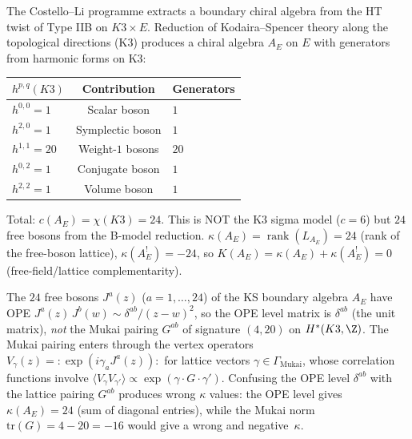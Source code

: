 \begin{construction}
\label{constr:costello-li-k3xe}
The Costello--Li programme extracts a boundary chiral algebra from
the HT twist of Type IIB on $K3 \times E$. Reduction of
Kodaira--Spencer theory along the topological directions (K3)
produces a chiral algebra $A_E$ on $E$ with generators from
harmonic forms on K3:
\begin{center}
\small
\renewcommand{\arraystretch}{1.2}
\begin{tabular}{lcl}
$h^{p,q}(K3)$ & Contribution & Generators \\
\hline
$h^{0,0} = 1$ & Scalar boson & $1$ \\
$h^{2,0} = 1$ & Symplectic boson & $1$ \\
$h^{1,1} = 20$ & Weight-$1$ bosons & $20$ \\
$h^{0,2} = 1$ & Conjugate boson & $1$ \\
$h^{2,2} = 1$ & Volume boson & $1$
\end{tabular}
\end{center}
Total: $c(A_E) = \chi(K3) = 24$. This is NOT the K3 sigma model
($c = 6$) but $24$ free bosons from the B-model reduction.
$\kappa(A_E) = \operatorname{rank}(L_{A_E}) = 24$
\textup{(}rank of the free-boson lattice\textup{)},
$\kappa(A_E^!) = -24$, so
$K(A_E) = \kappa(A_E) + \kappa(A_E^!) = 0$
\textup{(}free-field/lattice complementarity\textup{)}.
\end{construction}

\begin{warning}
\label{warn:ope-level-mukai}
The $24$ free bosons $J^a(z)$ ($a = 1, \ldots, 24$) of the KS
boundary algebra $A_E$ have OPE
$J^a(z)\,J^b(w) \sim \delta^{ab}/(z-w)^2$,
so the OPE level matrix is $\delta^{ab}$ (the unit matrix),
\emph{not} the Mukai pairing $G^{ab}$ of signature $(4,20)$ on
$H^*(K3, \Z)$. The Mukai pairing enters through the vertex
operators $V_\gamma(z) = {:}\!\exp(i\gamma_a J^a(z))\!{:}$
for lattice vectors $\gamma \in \Gamma_{\mathrm{Mukai}}$,
whose correlation functions involve
$\langle V_\gamma V_{\gamma'} \rangle \propto
\exp(\gamma \cdot G \cdot \gamma')$. Confusing the OPE level
$\delta^{ab}$ with the lattice pairing $G^{ab}$ produces wrong
$\kappa$ values: the OPE level gives $\kappa(A_E) = 24$
(sum of diagonal entries), while the Mukai norm
$\mathrm{tr}(G) = 4 - 20 = -16$ would give a wrong and
negative~$\kappa$.
\end{warning}

